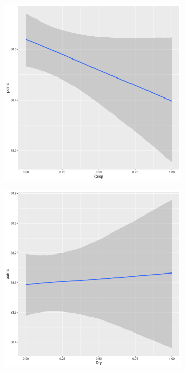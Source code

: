 \documentclass{article}
\begin{document}
\begin{figure}[htbp]
\begin{subfigure}{0.22\textwidth}
	\end{subfigure}\hfill
	\begin{subfigure}{0.22\textwidth}
		\includegraphics[width=\textwidth]{imgs/Rplots-13.pdf}
	\end{subfigure}\hfill
	\begin{subfigure}{0.22\textwidth}
		\includegraphics[width=\textwidth]{imgs/Rplots-14.pdf}
	\end{subfigure}
	

\end{figure}
\end{document}
